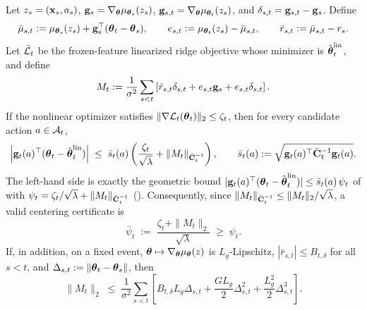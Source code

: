 \documentclass[twoside]{article}
\begin{document}
\begin{lemma}\label{lem:primitive-pred}
Let $z_s=(\mathbf{x}_s,a_s)$,
$\mathbf{g}_s=\nabla_{\boldsymbol{\theta}}\mu_{\boldsymbol{\theta}_s}(z_s)$,
$\mathbf{g}_{s,t}=\nabla_{\boldsymbol{\theta}}\mu_{\boldsymbol{\theta}_t}(z_s)$, and
$\delta_{s,t}=\mathbf{g}_{s,t}-\mathbf{g}_s$.  Define
\[
  \bar\mu_{s,t}
  :=
  \mu_{\boldsymbol{\theta}_s}(z_s)+\mathbf{g}_s^\top(\boldsymbol{\theta}_t-\boldsymbol{\theta}_s),
  \qquad
  e_{s,t}:=\mu_{\boldsymbol{\theta}_t}(z_s)-\bar\mu_{s,t},
  \qquad
  \bar r_{s,t}:=\bar\mu_{s,t}-r_s .
\]
Let $\bar{\mathcal{L}}_t$ be the frozen-feature linearized ridge objective whose
minimizer is $\hat{\boldsymbol{\theta}}_t^{\mathrm{lin}}$, and define
\[
  M_t
  :=
  \frac{1}{\sigma^2}
  \sum_{s<t}
  \left[
    \bar r_{s,t}\delta_{s,t}
    +
    e_{s,t}\mathbf{g}_s
    +
    e_{s,t}\delta_{s,t}
  \right].
\]
If the nonlinear optimizer satisfies
$\|\nabla \mathcal{L}_t(\boldsymbol{\theta}_t)\|_2\le\zeta_t$, then for every candidate
action $a\in\mathcal{A}_t$,
\[
  \left|
  \mathbf{g}_t(a)^\top
  (\boldsymbol{\theta}_t-\hat{\boldsymbol{\theta}}_t^{\mathrm{lin}})
  \right|
  \;\le\;
  \bar s_t(a)
  \left(
    \frac{\zeta_t}{\sqrt{\lambda}}
    +
    \|M_t\|_{\bar{\mathbf{C}}_t^{-1}}
  \right),
  \qquad
  \bar s_t(a):=\sqrt{\mathbf{g}_t(a)^\top\bar{\mathbf{C}}_t^{-1}\mathbf{g}_t(a)} .
\]
The left-hand side is exactly the geometric bound
$|\mathbf{g}_t(a)^\top(\boldsymbol{\theta}_t-\hat{\boldsymbol{\theta}}_t^{\mathrm{lin}})|\le\bar s_t(a)\,\psi_t$
of  with $\psi_t=\zeta_t/\sqrt\lambda+\|M_t\|_{\bar{\mathbf{C}}_t^{-1}}$
().  Consequently, since
$\|M_t\|_{\bar{\mathbf{C}}_t^{-1}}\le\|M_t\|_2/\sqrt{\lambda}$, a valid centering
certificate is
\[
  \bar\psi_t
  \;:=\;
  \frac{\zeta_t+\|M_t\|_2}{\sqrt{\lambda}}
  \;\ge\;
  \psi_t .
\]
If, in addition, on a fixed event,
$\boldsymbol{\theta}\mapsto\nabla_{\boldsymbol{\theta}}\mu_{\boldsymbol{\theta}}(z)$ is $L_g$-Lipschitz,
$|\bar r_{s,t}|\le B_{t,\delta}$ for all $s<t$, and
$\Delta_{s,t}:=\|\boldsymbol{\theta}_t-\boldsymbol{\theta}_s\|$, then
\[
  \|M_t\|_2
  \;\le\;
  \frac{1}{\sigma^2}
  \sum_{s<t}
  \left[
    B_{t,\delta} L_g\Delta_{s,t}
    +
    \frac{G L_g}{2}\Delta_{s,t}^2
    +
    \frac{L_g^2}{2}\Delta_{s,t}^3
  \right].
\]
\end{lemma}
\end{document}
